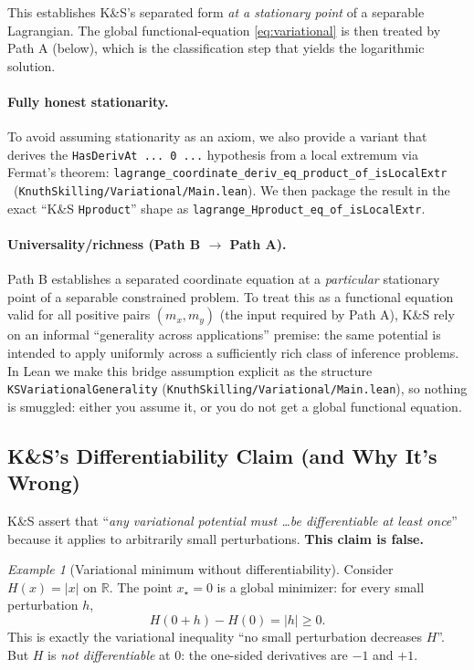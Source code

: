 \documentclass[11pt]{article}
\theoremstyle{definition}
\theoremstyle{remark}
\newtheorem{example}[theorem]{Example}
\begin{document}
This establishes K\&S's separated form \emph{at a stationary point} of a separable Lagrangian.
The global functional-equation \eqref{eq:variational} is then treated by Path A (below), which is the
classification step that yields the logarithmic solution.

\paragraph{Fully honest stationarity.}
To avoid assuming stationarity as an axiom, we also provide a variant that derives the
\texttt{HasDerivAt ... 0 ...} hypothesis from a local extremum via Fermat's theorem:
\texttt{lagrange\_coordinate\_deriv\_eq\_product\_of\_isLocalExtr}
\ (\texttt{KnuthSkilling/Variational/Main.lean}).
We then package the result in the exact ``K\&S \texttt{Hproduct}'' shape as
\texttt{lagrange\_Hproduct\_eq\_of\_isLocalExtr}.

\paragraph{Universality/richness (Path B $\to$ Path A).}
Path B establishes a separated coordinate equation at a \emph{particular} stationary point of a
separable constrained problem.
To treat this as a functional equation valid for all positive pairs $(m_x,m_y)$ (the input required
by Path A), K\&S rely on an informal ``generality across applications'' premise: the same potential
is intended to apply uniformly across a sufficiently rich class of inference problems.
In Lean we make this bridge assumption explicit as the structure
\texttt{KSVariationalGenerality} (\texttt{KnuthSkilling/Variational/Main.lean}),
so nothing is smuggled: either you assume it, or you do not get a global functional equation.

\subsection{K\&S's Differentiability Claim (and Why It's Wrong)}

K\&S assert that ``\emph{any variational potential must \ldots be differentiable at least once}'' because it applies to arbitrarily small perturbations.
\textbf{This claim is false.}

\begin{example}[Variational minimum without differentiability]
Consider $H(x) = |x|$ on $\mathbb{R}$.
The point $x_\star = 0$ is a global minimizer: for every small perturbation $h$,
\[H(0 + h) - H(0) = |h| \geq 0.\]
This is exactly the variational inequality ``no small perturbation decreases $H$''.
But $H$ is \emph{not differentiable} at $0$: the one-sided derivatives are $-1$ and $+1$.
\end{example}
\end{document}
